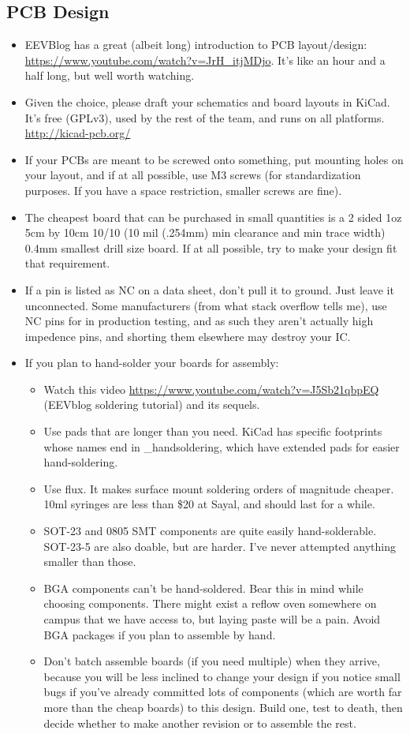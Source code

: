 \documentclass{article}
\begin{document}
\subsection{PCB Design}
\begin{itemize}
\item EEVBlog has a great (albeit long) introduction to PCB layout/design: \url{https://www.youtube.com/watch?v=JrH_itjMDjo}. It's like an hour and a half long, but well worth watching.
\item Given the choice, please draft your schematics and board layouts in KiCad. It's free (GPLv3), used by the rest of the team, and runs on all platforms. \url{http://kicad-pcb.org/}
\item If your PCBs are meant to be screwed onto something, put mounting holes on your layout, and if at all possible, use M3 screws (for standardization purposes. If you have a space restriction, smaller screws are fine).
\item The cheapest board that can be purchased in small quantities is a 2 sided 1oz 5cm by 10cm 10/10 (10 mil (.254mm) min clearance and min trace width) 0.4mm smallest drill size board. If at all possible, try to make your design fit that requirement.
\item If a pin is listed as NC on a data sheet, don't pull it to ground. Just leave it unconnected. Some manufacturers (from what stack overflow tells me), use NC pins for in production testing, and as such they aren't actually high impedence pins, and shorting them elsewhere may destroy your IC.

\item If you plan to hand-solder your boards for assembly:
\begin{itemize}
\item Watch this video \url{https://www.youtube.com/watch?v=J5Sb21qbpEQ} (EEVblog soldering tutorial) and its sequels.
\item Use pads that are longer than you need. KiCad has specific footprints whose names end in \_handsoldering, which have extended pads for easier hand-soldering.
\item Use flux. It makes surface mount soldering orders of magnitude cheaper. 10ml syringes are less than \$20 at Sayal, and should last for a while.
\item SOT-23 and 0805 SMT components are quite easily hand-solderable. SOT-23-5 are also doable, but are harder. I've never attempted anything smaller than those.
\item BGA components can't be hand-soldered. Bear this in mind while choosing components. There might exist a reflow oven somewhere on campus that we have access to, but laying paste will be a pain. Avoid BGA packages if you plan to assemble by hand.
\item Don't batch assemble boards (if you need multiple) when they arrive, because you will be less inclined to change your design if you notice small bugs if you've already committed lots of components (which are worth far more than the cheap boards) to this design. Build one, test to death, then decide whether to make another revision or to assemble the rest.
\end{itemize}
\end{itemize}
\end{document}
